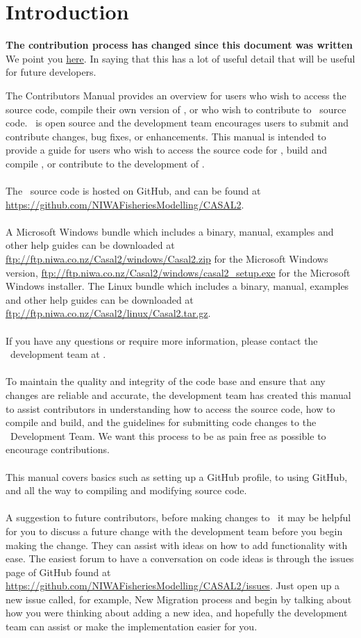 \section{Introduction\label{sec:Introduction}}
\textbf{The contribution process has changed since this document was written} We point you \href{https://casal2.github.io/contributing/}{here}. In saying that this has a lot of useful detail that will be useful for future developers.


The Contributors Manual provides an overview for users who wish to access the source code, compile their own version of \CNAME , or who wish to contribute to \CNAME\ source code. \CNAME\ is open source and the development team encourages users to submit and contribute changes, bug fixes, or enhancements. This manual is intended to provide a guide for users who wish to access the source code for \CNAME , build and compile  \CNAME , or contribute to the development of \CNAME . 
\\\\
The \CNAME\ source code is hosted on GitHub, and can be found at \url{https://github.com/NIWAFisheriesModelling/CASAL2}.
\\\\
A Microsoft Windows bundle which includes a binary, manual, examples and other help guides can be downloaded at \url{ftp://ftp.niwa.co.nz/Casal2/windows/Casal2.zip} for the Microsoft Windows version, \url{ftp://ftp.niwa.co.nz/Casal2/windows/casal2_setup.exe} for the Microsoft Windows installer. The Linux bundle which includes a binary, manual, examples and other help guides can be downloaded at \url{ftp://ftp.niwa.co.nz/Casal2/linux/Casal2.tar.gz}.
\\\\
If you have any questions or require more information, please contact the \CNAME\ development team at \email.
\\\\
To maintain the quality and integrity of the code base and ensure that any changes are reliable and accurate, the development team has created this manual to assist contributors in understanding how to access the source code, how to compile and build, and the guidelines for submitting code changes to the \CNAME\ Development Team. We want this process to be as pain free as possible to encourage contributions. 
\\\\
This manual covers basics such as setting up a GitHub profile, to using GitHub, and all the way to compiling and modifying source code. 
\\\\
A suggestion to future contributors, before making changes to \CNAME\ it may be helpful for you to discuss a future change with the development team before you begin making the change. They can assist with ideas on how to add functionality with ease. The easiest forum to have a conversation on code ideas is through the issues page of GitHub found at \url{https://github.com/NIWAFisheriesModelling/CASAL2/issues}. Just open up a new issue called, for example, New Migration process and begin by talking about how you were thinking about adding a new idea, and hopefully the development team can assist or make the implementation easier for you.
